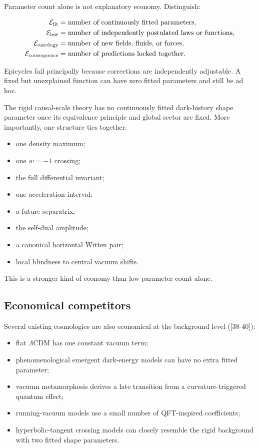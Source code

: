 \documentclass[
  11pt,
  letterpaper,
]{article}
\providecommand{\tightlist}{%
  \setlength{\itemsep}{0pt}\setlength{\parskip}{0pt}}
\begin{document}
Parameter count alone is not explanatory economy. Distinguish:

\[
\begin{aligned}
\mathcal E_{\rm fit}&=\text{number of continuously fitted parameters},\\
\mathcal E_{\rm law}&=\text{number of independently postulated laws or functions},\\
\mathcal E_{\rm ontology}&=\text{number of new fields, fluids, or forces},\\
\mathcal E_{\rm consequence}&=\text{number of predictions locked together}.
\end{aligned}
\]

Epicycles fail principally because corrections are independently
adjustable. A fixed but unexplained function can have zero fitted
parameters and still be ad hoc.

The rigid causal-scale theory has no continuously fitted dark-history
shape parameter once its equivalence principle and global sector are
fixed. More importantly, one structure ties together:

\begin{itemize}
\tightlist
\item
  one density maximum;
\item
  one \(w=-1\) crossing;
\item
  the full differential invariant;
\item
  one acceleration interval;
\item
  a future separatrix;
\item
  the self-dual amplitude;
\item
  a canonical horizontal Witten pair;
\item
  local blindness to central vacuum shifts.
\end{itemize}

This is a stronger kind of economy than low parameter count alone.

\subsection{Economical competitors}\label{economical-competitors}

Several existing cosmologies are also economical at the background level
({[}38-40{]}):

\begin{itemize}
\tightlist
\item
  flat \(\Lambda\)CDM has one constant vacuum term;
\item
  phenomenological emergent dark-energy models can have no extra fitted
  parameter;
\item
  vacuum metamorphosis derives a late transition from a
  curvature-triggered quantum effect;
\item
  running-vacuum models use a small number of QFT-inspired coefficients;
\item
  hyperbolic-tangent crossing models can closely resemble the rigid
  background with two fitted shape parameters.
\end{itemize}
\end{document}
